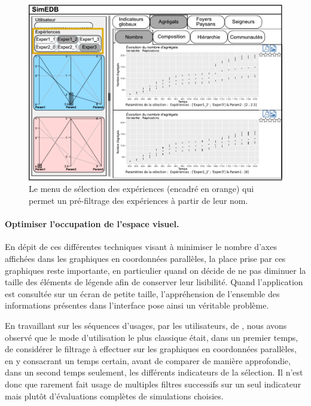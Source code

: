 \begin{figure}[H]
	\centering
	\includegraphics[width=\linewidth]{img/mockup_SimEDB_selectinput.pdf}
	\caption[Le menu de sélection des expériences.]{Le menu de sélection des expériences (encadré en orange) qui permet un pré-filtrage des expériences à partir de leur nom.}
	\label{fig:simedb-prefilter}
\end{figure}

\paragraph{Optimiser l'occupation de l'espace visuel.}\label{par:simedb-resize-parcoords}

En dépit de ces différentes techniques visant à minimiser le nombre d'axes affichées dans les graphiques en coordonnées parallèles, la place prise par ces graphiques reste importante, en particulier quand on décide de ne pas diminuer la taille des éléments de légende afin de conserver leur lisibilité.
Quand l'application est consultée sur un écran de petite taille, l'appréhension de l'ensemble des informations présentes dans l'interface pose ainsi un véritable problème.

En travaillant sur les séquences d'usages, par les utilisateurs, de \simedb{}, nous avons observé que le mode d'utilisation le plus classique était, dans un premier temps, de considérer le filtrage à effectuer sur les graphiques en coordonnées parallèles, en y consacrant un temps certain, avant de comparer de manière approfondie, dans un second temps seulement, les différents indicateurs de la sélection.
Il n'est donc que rarement fait usage de multiples filtres successifs sur un seul indicateur mais plutôt d'évaluations complètes de simulations choisies.

